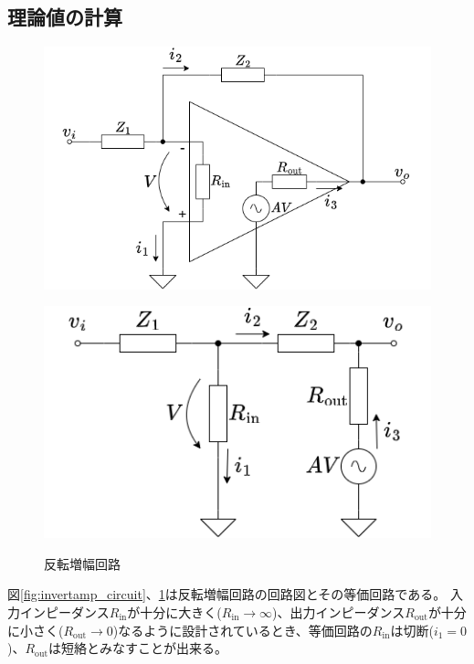 \documentclass[a4paper]{ltjsarticle}
\begin{document}
\subsection{理論値の計算} \label{sec:invertamp_theory}
\begin{figure}[htbp]
    \centering
    \begin{minipage}{0.48\columnwidth}
        \centering
        \includegraphics[width=0.95\columnwidth]{./images/invertamp.png}
        \label{fig:invertamp_circuit}
    \end{minipage}
    \begin{minipage}{0.48\columnwidth}
        \centering
        \includegraphics[width=0.95\columnwidth]{./images/invertamp_c.png}
        \label{fig:invertamp_eqcircuit}
    \end{minipage}
    \caption{反転増幅回路}
\end{figure}
図\ref{fig:invertamp_circuit}、\ref{fig:invertamp_eqcircuit}は反転増幅回路の回路図とその等価回路である。
入力インピーダンス$R_\text{in}$が十分に大きく($R_\text{in}\rightarrow\infty$)、出力インピーダンス$R_\text{out}$が十分に小さく($R_\text{out}\rightarrow0$)なるように設計されているとき、等価回路の$R_\text{in}$は切断($i_1=0$)、$R_\text{out}$は短絡とみなすことが出来る。
\end{document}
